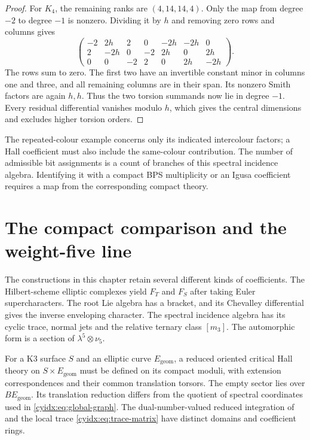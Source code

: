 \begin{proof}
For \(K_4\), the remaining ranks are
\((4,14,14,4)\). Only the map from degree \(-2\)
to degree \(-1\) is nonzero. Dividing it by \(h\)
and removing zero rows and columns gives
\[
 \begin{pmatrix}
 -2&2h&2&0&-2h&-2h&0\\
 2&-2h&0&-2&2h&0&2h\\
 0&0&-2&2&0&2h&-2h
 \end{pmatrix}.
\]
The rows sum to zero. The first two have an invertible
constant minor in columns one and three, and all
remaining columns are in their span. Its nonzero
Smith factors are again \(h,h\). Thus the two
torsion summands now lie in degree \(-1\).
Every residual differential vanishes modulo \(h\),
which gives the central dimensions and excludes
higher torsion orders.
\end{proof}

The repeated-colour example concerns only its indicated
intercolour factors; a Hall coefficient must also
include the same-colour contribution. The number of
admissible bit assignments is a count of branches
of this spectral incidence algebra. Identifying it
with a compact BPS multiplicity or an Igusa coefficient
requires a map from the corresponding compact theory.

\section{The compact comparison and the weight-five line}
\label{cyidx:sec:comparison}

The constructions in this chapter retain several
different kinds of coefficients. The Hilbert-scheme
elliptic complexes yield \(F_T\) and \(F_S\) after
taking Euler supercharacters. The root Lie algebra
has a bracket, and its Chevalley differential gives
the inverse enveloping character. The spectral
incidence algebra has its cyclic trace, normal jets
and the relative ternary class \([m_3]\). The
automorphic form is a section of
\(\lambda^5\otimes\nu_5\).

For a K3 surface \(S\) and an elliptic curve
\(E_{\mathrm{geom}}\), a reduced oriented critical
Hall theory on \(S\times E_{\mathrm{geom}}\) must
be defined on its compact moduli, with extension
correspondences and their common translation torsors.
The empty sector lies over \(BE_{\mathrm{geom}}\).
Its translation reduction differs from the quotient
of spectral coordinates used in
\eqref{cyidx:eq:global-graph}. The dual-number-valued
reduced integration of \cite{OberdieckShen} and the
local trace \eqref{cyidx:eq:trace-matrix} have distinct
domains and coefficient rings.

